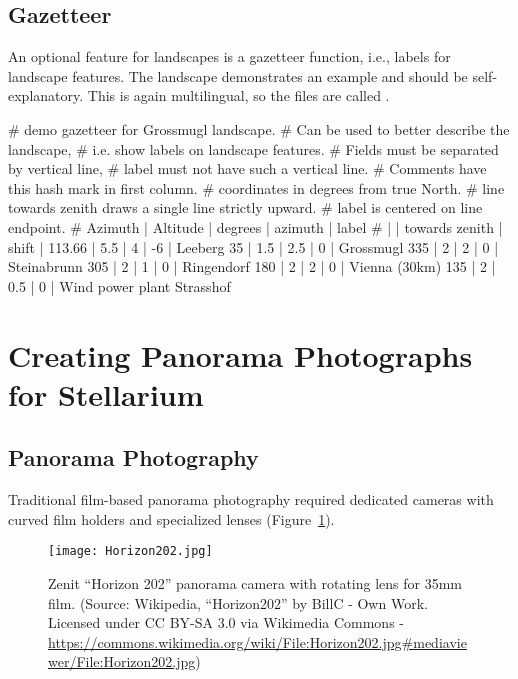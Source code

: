 \subsection{Gazetteer}
\label{sec:landscapes:Gazetteer}

An optional feature for landscapes is a gazetteer function, i.e., labels for
landscape features. The  landscape demonstrates
an example and should be self-explanatory. This is again multilingual,
so the files are called .

\begin{configfile}[\scriptsize]
# demo gazetteer for Grossmugl landscape.
# Can be used to better describe the landscape, 
# i.e. show labels on landscape features.
# Fields must be separated by vertical line, 
# label must not have such a vertical line.
# Comments have this hash mark in first column. 
# coordinates in degrees from true North. 
# line towards zenith draws a single line strictly upward.
# label is centered on line endpoint. 
# Azimuth | Altitude | degrees        | azimuth | label
#         |          | towards zenith |  shift  |               
113.66    | 5.5      |     4          |   -6    | Leeberg
35        | 1.5      |     2.5        |    0    | Grossmugl
335       | 2        |     2          |    0    | Steinabrunn
305       | 2        |     1          |    0    | Ringendorf
180       | 2        |     2          |    0    | Vienna (30km)
135       | 2        |     0.5        |    0    | Wind power plant Strasshof
\end{configfile}


\newpage

\section{Creating Panorama Photographs for Stellarium}
\label{sec:landscapes:PanoramaPhotography}

\subsection{Panorama Photography}
\label{sec:landscapes:PanoramaPhotography:Photography}

Traditional film-based panorama photography required dedicated cameras with curved
film holders and specialized lenses
(Figure~\ref{fig:landscapes:panoCam}).


\begin{figure}[tbp]
  \centering
 \texttt{[image: Horizon202.jpg]}
 \caption{Zenit ``Horizon 202'' panorama camera with rotating lens for
   35mm film. \footnotesize{(Source: Wikipedia, ``Horizon202'' by
     BillC - Own Work. Licensed under CC BY-SA 3.0 via Wikimedia
     Commons -
     \url{https://commons.wikimedia.org/wiki/File:Horizon202.jpg\#mediaviewer/File:Horizon202.jpg})}}
  \label{fig:landscapes:panoCam}
\end{figure}



